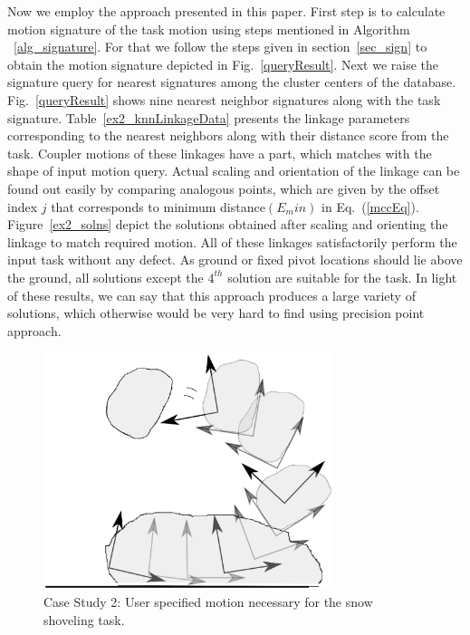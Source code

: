 \documentclass[twocolumn,10pt]{asme2ej}
\newcommand{\req}[1]{(\ref{#1})}
\begin{document}
Now we employ the approach presented in this paper.
First step is to calculate motion signature of the task motion using steps mentioned in Algorithm ~\ref{alg_signature}.
For that we follow the steps given in section~\ref{sec_sign} to obtain the motion signature depicted in Fig.~\ref{queryResult}.
Next we raise the signature query for nearest signatures among the cluster centers of the database.
Fig.~\ref{queryResult} shows nine nearest neighbor signatures along with the task signature.
Table~\ref{ex2_knnLinkageData} presents the linkage parameters corresponding to the nearest neighbors along with their distance score from the task.
Coupler motions of these linkages have a part, which matches with the shape of input motion query.
Actual scaling and orientation of the linkage can be found out easily by comparing analogous points, which are given by the offset index $j$ that corresponds to minimum distance$(E_min)$ in Eq.~\req{mccEq}.
Figure~\ref{ex2_solns} depict the solutions obtained after scaling and orienting the linkage to match required motion.
All of these linkages satisfactorily perform the input task without any defect.
As ground or fixed pivot locations should lie above the ground, all solutions except the $4^{th}$ solution are suitable for the task.
In light of these results, we can say that this approach produces a large variety of solutions, which otherwise would be very hard to find using precision point approach.

\begin{figure}
\centering
\includegraphics[width=240pt]{figure/fig_motion_query.eps}
  \caption{Case Study 2: User specified motion necessary for the snow shoveling task.}
\label{motionQuery}
\end{figure}
\end{document}
